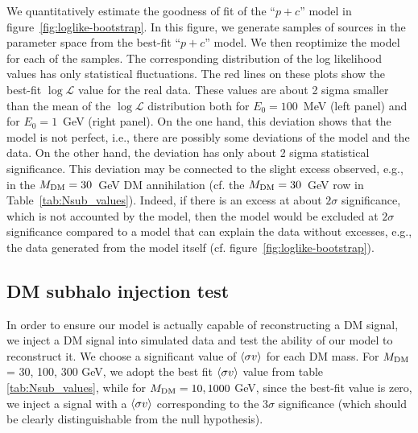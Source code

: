 We quantitatively estimate the goodness of fit of the ``$p + c$'' model in figure~\ref{fig:loglike-bootstrap}.
In this figure, we generate samples of sources in the parameter space from the best-fit ``$p + c$'' model. We then reoptimize the model for each of the samples.
The corresponding distribution of the log likelihood values has only statistical fluctuations.
The red lines on these plots show the best-fit $\log \mathcal{L}$ value for the real data.
These values are about 2 sigma smaller than the mean of the $\log \mathcal{L}$ distribution both for $E_0 = 100$~MeV (left panel) and for $E_0 = 1$~GeV (right panel).
On the one hand, this deviation shows that the model is not perfect, i.e., there are possibly some deviations of the model and the data.
On the other hand, the deviation has only about 2 sigma statistical significance.
This deviation may be connected to the slight excess observed, e.g., in the ${M_\textrm{DM}} = 30$~GeV DM annihilation (cf. the ${M_\textrm{DM}} = 30$~GeV row in Table~\ref{tab:Nsub_values}).
{Indeed, if there is an excess at about $2\sigma$ significance, which is not accounted by the model, then the model would be excluded at $2 \sigma$ significance compared to a model that can explain the data without excesses, e.g., the data generated from the model itself (cf. figure~\ref{fig:loglike-bootstrap}).}


\subsection{DM subhalo injection test}
\label{app:DM_injection}

In order to ensure our model is actually capable of reconstructing a DM signal, we inject a DM signal into simulated data and test the ability of our model to reconstruct it.
We choose a significant value of $\langle \sigma v \rangle$ for each DM mass. For ${M_\textrm{DM}}$ = 30, 100, 300 GeV, we adopt the best fit $\langle \sigma v \rangle$ value from table \ref{tab:Nsub_values}, while for ${M_\textrm{DM}} = 10, 1000$ GeV, since the best-fit value is zero, we inject a signal with a $\langle \sigma v \rangle$ corresponding to the 3$\sigma$ significance (which should be clearly distinguishable from the null hypothesis). 

